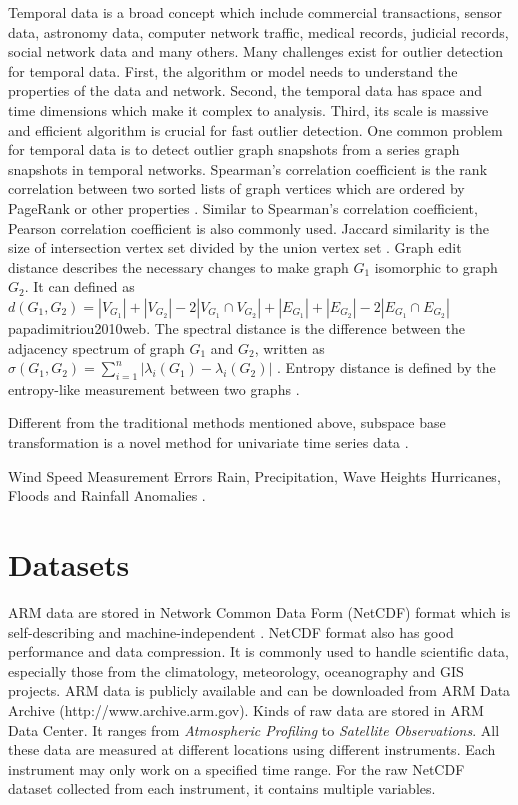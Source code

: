 \documentclass[letterpaper, 10 pt, conference]{ieeeconf}  %
\begin{document}
Temporal data is a broad concept which include commercial transactions, sensor data, astronomy data, computer network traffic, medical records, judicial records, social network data and many others. Many challenges exist for outlier detection for temporal data. First, the algorithm or model needs to understand the properties of the data and network. Second, the temporal data has space and time dimensions which make it complex to analysis. Third, its scale is massive and efficient algorithm is crucial for fast outlier detection. One common problem for temporal data is to detect outlier graph snapshots from a series graph snapshots in temporal networks. Spearman’s correlation coefficient is the rank correlation between two sorted lists of graph vertices which are ordered by PageRank or other properties \cite{papadimitriou2010web}. Similar to Spearman’s correlation coefficient, Pearson correlation coefficient is also commonly used. Jaccard similarity is the size of intersection vertex set divided by the union vertex set \cite{jay2012systematic}. Graph edit distance describes the necessary changes to make graph $G_1$ isomorphic to graph $G_2$. It can defined as $d(G_1, G_2) = |V_{G_1}| + |V_{G_2}| - 2|V_{G_1} \cap V_{G_2}| + |E_{G_1}| + |E_{G_2}| - 2|E_{G_1} \cap E_{G_2}|$ {papadimitriou2010web}. The spectral distance is the difference between the adjacency spectrum of graph $G_1$ and $G_2$, written as $\sigma(G_1, G_2) = \displaystyle\sum_{i=1}^{n}|\lambda_i(G_1) - \lambda_i(G_2)|$ \cite{jovanovic2012spectral}. Entropy distance is defined by the entropy-like measurement between two graphs \cite{pincombe2005anomaly}.

Different from the traditional methods mentioned above, subspace base transformation is a novel method for univariate time series data \cite{cheboli2010anomaly}. 

Wind Speed Measurement Errors \cite{hill2007real, hill2010anomaly}
Rain, Precipitation, Wave Heights \cite{kut2006spatio, angiulli2007detecting}
Hurricanes, Floods and Rainfall Anomalies \cite{drosdowsky1993analysis, lu2004wavelet, lasaponara2006use}.

\section{Datasets}
ARM data are stored in Network Common Data Form (NetCDF) format which is self-describing and machine-independent \cite{rew1990netcdf, NetCDF}. NetCDF format also has good performance and data compression. It is commonly used to handle scientific data, especially those from the climatology, meteorology, oceanography and GIS projects. ARM data is publicly available and can be downloaded from ARM Data Archive (http://www.archive.arm.gov). Kinds of raw data are stored in ARM Data Center. It ranges from \textit{Atmospheric Profiling} to \textit{Satellite Observations}. All these data are measured at different locations using different instruments. Each instrument may only work on a specified time range. For the raw NetCDF dataset collected from each instrument, it contains multiple variables. 
\end{document}
